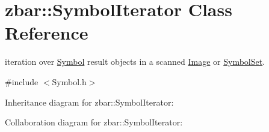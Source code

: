 \hypertarget{classzbar_1_1_symbol_iterator}{
\section{zbar::SymbolIterator Class Reference}
\label{classzbar_1_1_symbol_iterator}
}


iteration over \hyperlink{classzbar_1_1_symbol}{Symbol} result objects in a scanned \hyperlink{classzbar_1_1_image}{Image} or \hyperlink{classzbar_1_1_symbol_set}{SymbolSet}.  




{\ttfamily \#include $<$Symbol.h$>$}



Inheritance diagram for zbar::SymbolIterator:


Collaboration diagram for zbar::SymbolIterator:
